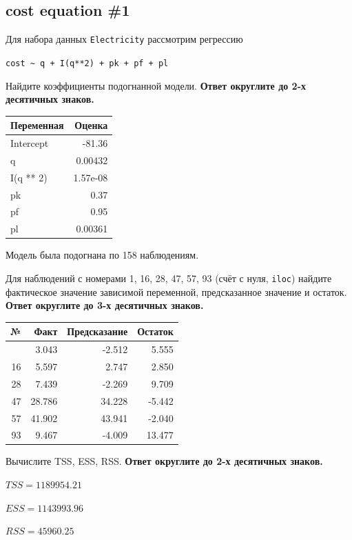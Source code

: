 \documentclass[
  russian,
]{article}
\newcounter{none} %
\begin{document}
\subsection{cost equation \#1}\label{cost-equation-1}

Для набора данных \texttt{Electricity} рассмотрим регрессию

\texttt{cost\ \textasciitilde{}\ q\ +\ I(q**2)\ +\ pk\ +\ pf\ +\ pl}

Найдите коэффициенты подогнанной модели. \textbf{Ответ округлите до 2-х
десятичных знаков.}

{\def\LTcaptype{none} %
\begin{longtable}[]{@{}lr@{}}
\toprule\noalign{}
Переменная & Оценка \\
\midrule\noalign{}
\endhead
\bottomrule\noalign{}
\endlastfoot
Intercept & -81.36 \\
q & 0.00432 \\
I(q ** 2) & 1.57e-08 \\
pk & 0.37 \\
pf & 0.95 \\
pl & 0.00361 \\
\end{longtable}
}

Модель была подогнана по 158 наблюдениям.

Для наблюдений с номерами 1, 16, 28, 47, 57, 93 (счёт с нуля,
\texttt{iloc}) найдите фактическое значение зависимой переменной,
предсказанное значение и остаток. \textbf{Ответ округлите до 3-х
десятичных знаков.}

{\def\LTcaptype{none} %
\begin{longtable}[]{@{}rrrr@{}}
\toprule\noalign{}
№ & Факт & Предсказание & Остаток \\
\midrule\noalign{}
\endhead
\bottomrule\noalign{}
\endlastfoot
1 & 3.043 & -2.512 & 5.555 \\
16 & 5.597 & 2.747 & 2.850 \\
28 & 7.439 & -2.269 & 9.709 \\
47 & 28.786 & 34.228 & -5.442 \\
57 & 41.902 & 43.941 & -2.040 \\
93 & 9.467 & -4.009 & 13.477 \\
\end{longtable}
}

Вычислите TSS, ESS, RSS. \textbf{Ответ округлите до 2-х десятичных
знаков.}

\begin{tcolorbox}[enhanced jigsaw, arc=.35mm, bottomrule=.15mm, bottomtitle=1mm, breakable, colback=white, colbacktitle=quarto-callout-note-color!10!white, colframe=quarto-callout-note-color-frame, coltitle=black, left=2mm, leftrule=.75mm, opacityback=0, opacitybacktitle=0.6, rightrule=.15mm, title=\textcolor{quarto-callout-note-color}{\faInfo}\hspace{0.5em}{Суммы квадратов}, titlerule=0mm, toprule=.15mm, toptitle=1mm]

\(TSS = 1189954.21\)

\(ESS = 1143993.96\)

\(RSS = 45960.25\)

\end{tcolorbox}
\end{document}
